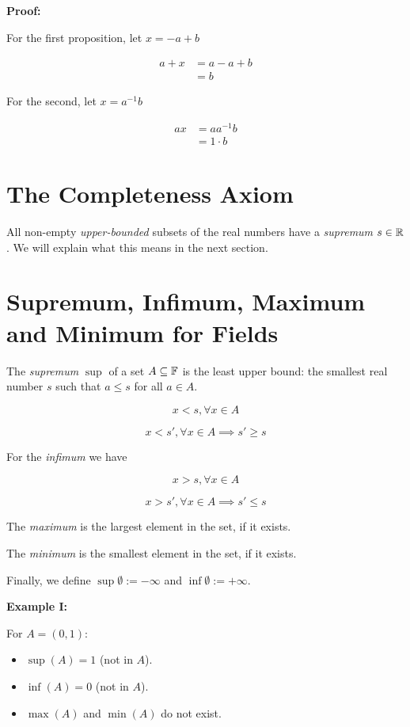 \textbf{Proof:}

For the first proposition, let \(x = -a + b\)

\begin{align*}
	a + x & = a -a + b \\
	      & = b
\end{align*}

For the second, let \(x = a^{-1}b\)

\begin{align*}
	ax & =  a a^{-1} b \\
	   & = 1 \cdot b
\end{align*}

\QED

\section{The Completeness Axiom}

All non-empty \emph{upper-bounded} subsets of the real numbers have a \emph{supremum} \(s \in \mathbb{R}\). We will
explain what this means in the next section.

\section{Supremum, Infimum, Maximum and Minimum for Fields}

The \emph{supremum} \(\sup\) of a set \(A \subseteq \mathbb{F}\) is the
least upper bound: the smallest real number \(s\) such that \(a \le s\) for all \(a \in A\).

\[
	x < s, \forall x \in A
\]

\[
	x < s', \forall x \in A \implies s' \ge s
\]

For the \emph{infimum} we have

\[
	x > s, \forall x \in A
\]

\[
	x > s', \forall x \in A \implies s' \le s
\]


The \emph{maximum} is the largest element in the set, if it exists.

The \emph{minimum} is the smallest element in the set, if it exists.

Finally, we define \(\sup \emptyset := - \infty\) and \(\inf \emptyset := +\infty\).

\textbf{Example I:}

For \(A = (0,1)\):

\begin{itemize}

	\item \(\sup(A) = 1\) (not in \(A\)).

	\item \(\inf(A) = 0\) (not in \(A\)).

	\item \(\max(A)\) and \(\min(A)\) do not exist.

\end{itemize}

